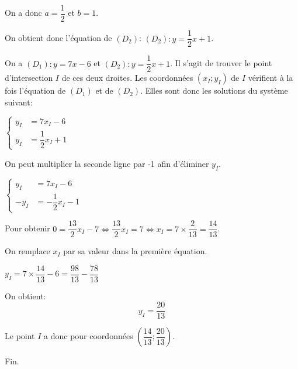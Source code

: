 \documentclass[a4paper,12pt]{scrartcl}
\begin{document}
On a donc $a = \dfrac{1}{2}$ et $b = 1$.

On obtient donc l'équation de $(D_2)$: $(D_2):y = \dfrac{1}{2}x + 1$.


On a $(D_1):y = 7x - 6$ et $(D_2):y = \dfrac{1}{2}x + 1$. Il s'agit de trouver le point d'intersection $I$ de ces deux droites. Les coordonnées $(x_I;y_I)$ de $I$ vérifient à la fois l'équation de $(D_1)$ et de $(D_2)$. Elles sont donc les solutions du système suivant:

$
\begin{cases}
y_I &= 7x_I - 6\\ 
y_I &= \dfrac{1}{2}x_I + 1
\end{cases}$

On peut multiplier la seconde ligne par -1 afin d'éliminer $y_I$.

$
\begin{cases}
y_I &= 7x_I - 6\\ 
-y_I &= -\dfrac{1}{2}x_I - 1
\end{cases}$

Pour obtenir $0 = \dfrac{13}{2}x_I - 7 \Leftrightarrow \dfrac{13}{2}x_I = 7 \Leftrightarrow x_I = 7 \times \dfrac{2}{13} = \dfrac{14}{13}$.

On remplace $x_I$ par sa valeur dans la première équation. 

$y_I = 7 \times \dfrac{14}{13} - 6 = \dfrac{98}{13} - \dfrac{78}{13}$ 

On obtient: $$y_I = \dfrac{20}{13}$$

Le point $I$ a donc pour coordonnées $\left( \dfrac{14}{13} ; \dfrac{20}{13} \right)$.

\trait

\begin{center}
Fin.
\end{center}
\end{document}
